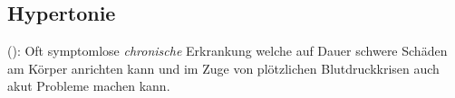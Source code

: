 % 
% 

\subsection{Hypertonie}
\label{topic:hypertonie}
(): Oft
symptomlose \textit{chronische} Erkrankung welche auf Dauer
schwere Schäden am Körper anrichten kann und im Zuge von
plötzlichen Blutdruckkrisen auch akut Probleme machen kann.

